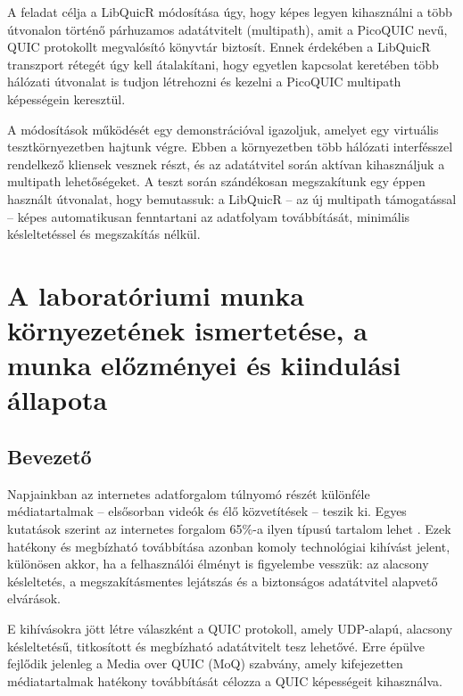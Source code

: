 \documentclass[a4paper,oneside]{article}
\begin{document}
\begin{titlepage}
{A feladat célja a LibQuicR módosítása úgy, hogy képes legyen kihasználni a több 
útvonalon történő párhuzamos adatátvitelt (multipath), amit a PicoQUIC nevű, QUIC 
protokollt megvalósító könyvtár biztosít. Ennek érdekében a LibQuicR transzport rétegét 
úgy kell átalakítani, hogy egyetlen kapcsolat keretében több hálózati útvonalat is 
tudjon létrehozni és kezelni a PicoQUIC multipath képességein keresztül.

A módosítások működését egy demonstrációval igazoljuk, amelyet egy virtuális 
tesztkörnyezetben hajtunk végre. Ebben a környezetben több hálózati interfésszel 
rendelkező kliensek vesznek részt, és az adatátvitel során aktívan kihasználjuk 
a multipath lehetőségeket. A teszt során szándékosan megszakítunk egy éppen használt 
útvonalat, hogy bemutassuk: a LibQuicR – az új multipath támogatással – képes 
automatikusan fenntartani az adatfolyam továbbítását, minimális késleltetéssel 
és megszakítás nélkül.}

 
  
 
\end{titlepage} 

\section{A laboratóriumi munka környezetének ismertetése,
     a munka előzményei és kiindulási állapota}
\label{sec:kornyezet}
\subsection{Bevezető}
\label{sec:bevezeto}
Napjainkban az internetes adatforgalom túlnyomó részét különféle médiatartalmak – 
elsősorban videók és élő közvetítések – teszik ki. Egyes kutatások 
szerint az internetes forgalom 65\%-a ilyen típusú tartalom lehet \cite{live_stats}. 
Ezek hatékony és megbízható továbbítása azonban komoly 
technológiai kihívást jelent, különösen akkor, ha a felhasználói élményt is 
figyelembe vesszük: az alacsony késleltetés, a megszakításmentes lejátszás 
és a biztonságos adatátvitel alapvető elvárások.

E kihívásokra jött létre válaszként a QUIC protokoll\cite{quic}, amely UDP-alapú, alacsony 
késleltetésű, titkosított és megbízható adatátvitelt tesz lehetővé. Erre épülve 
fejlődik jelenleg a Media over QUIC (MoQ) szabvány\cite{moq_draft}, amely kifejezetten 
médiatartalmak hatékony továbbítását célozza a QUIC képességeit kihasználva.
\end{document}
